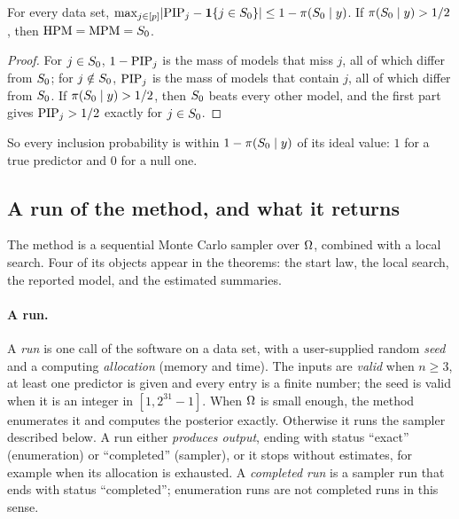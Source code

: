 \begin{lemma}\label{lem:summaries}
For every data set, $\max_{j\in[p]}\lvert \mathrm{PIP}_j-\mathbf{1}\{j\in S_0\}\rvert\le1-\pi(S_0\mid y)$. If $\pi(S_0\mid y)>1/2$, then
$\mathrm{HPM}=\mathrm{MPM}=S_0$.
\end{lemma}

\begin{proof}
For $j\in S_0$, $1-\mathrm{PIP}_j$ is the mass of models that miss $j$, all of which differ from $S_0$; for $j\notin S_0$,
$\mathrm{PIP}_j$ is the mass of models that contain $j$, all of which differ from $S_0$. If $\pi(S_0\mid y)>1/2$, then $S_0$ beats
every other model, and the first part gives $\mathrm{PIP}_j>1/2$ exactly for $j\in S_0$.
\end{proof}

So every inclusion probability is within $1-\pi(S_0\mid y)$ of its ideal value: $1$ for a true predictor and $0$ for a null
one.

\subsection{A run of the method, and what it returns}\label{sec:method}

The method is a sequential Monte Carlo sampler over $\Omega$, combined with a local search. Four of its objects appear in
the theorems: the start law, the local search, the reported model, and the estimated summaries.

\paragraph{A run.} A \emph{run} is one call of the software on a data set, with a user-supplied random \emph{seed} and
a computing \emph{allocation} (memory and time). The inputs are \emph{valid} when $n\ge3$, at least one predictor is
given and every entry is a finite number; the seed is valid when it is an integer in $[1,2^{31}-1]$. When $\Omega$ is small
enough, the method enumerates it and computes the posterior exactly. Otherwise it runs the sampler described below. A run
either \emph{produces output}, ending with status ``exact'' (enumeration) or ``completed'' (sampler), or it stops without
estimates, for example when its allocation is exhausted. A \emph{completed run} is a sampler run that ends with status
``completed''; enumeration runs are not completed runs in this sense.

